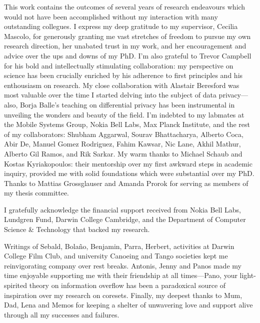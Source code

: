 
\begin{acknowledgements}
This work contains the outcomes of several years of research endeavours which would not have been accomplished without my interaction with many outstanding collegues. I express my deep gratitude to my supervisor, Cecilia Mascolo, for generously granting me vast stretches of freedom to pursue my own research direction, her unabated trust in my work, and her encouragement and advice over the ups and downs of my PhD. I'm also grateful to Trevor Campbell for his bold and intellectually stimulating collaboration: my perspective on science has been crucially enriched by his adherence to first principles and his enthousiasm on research. My close collaboration with Alastair Beresford was most valuable over the time I started delving into the subject of data privacy---also, Borja Balle's teaching on differential privacy has been instrumental in unveiling the wonders and beauty of the field. I'm indebted to my labmates at the Mobile Systems Group, Nokia Bell Labs, Max Planck Institute, and the rest of my collaborators:
Shubham Aggarwal, Sourav Bhattacharya, Alberto Coca, Abir De, Manuel Gomez Rodriguez, Fahim Kawsar, Nic Lane,  Akhil Mathur, Alberto Gil Ramos, and Rik Sarkar. My warm thanks to Michael Schaub and Kostas Kyriakopoulos: their mentorship over my first awkward steps in academic inquiry, provided me with solid foundations which were substantial over my PhD. Thanks to
Mattias Grossglauser and Amanda Prorok for serving as members of my thesis committee.

I gratefully acknowledge the financial support received from Nokia Bell Labs, Lundgren Fund, Darwin College Cambridge, and the Department of Computer Science \& Technology that backed my research. 

Writings of Sebald, Bola{\~{n}}o, Benjamin, Parra, Herbert, activities at Darwin College Film Club, and university Canoeing and Tango societies kept me reinvigorating company over rest breaks. Antonis, Jenny and Panos made my time enjoyable supporting me with their friendship at all times---Pano, your light-spirited theory on information overflow has been a paradoxical source of inspiration over my research on coresets. Finally, my deepest thanks to Mum, Dad, Lena and Memos for keeping a shelter of unwavering love and support alive through all my successes and failures.
\end{acknowledgements}
